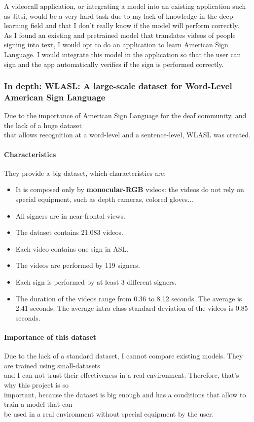 A videocall application, or integrating a model into an existing application such as Jitsi, would be a very hard task due to my lack of knowledge in the deep learning field and that I don't really know if the model will perform correctly. \\ 

As I found an existing and pretrained model that translates videos of people signing into text, I would opt to do an application to learn American Sign Language. I would integrate this model in the application so that the user can sign and the app automatically verifies if the sign is performed correctly.

\subsubsection{In depth: WLASL: A large-scale dataset for Word-Level American Sign Language}
Due to the importance of American Sign Language for the deaf community, and the lack of a huge dataset \\
that allows recognition at a word-level and a sentence-level, WLASL was created. 

\paragraph{Characteristics}
They provide a big dataset, which characteristics are:
\begin{itemize}
    \item It is composed only by \textbf{monocular-RGB} videos: the videos do not rely on special equipment, such as depth cameras, colored gloves...
    \item All signers are in near-frontal views.
    \item The dataset contains 21.083 videos.
    \item Each video contains one sign in ASL.
    \item The videos are performed by 119 signers.
    \item Each sign is performed by at least 3 different signers.
    \item The duration of the videos range from 0.36 to 8.12 seconds. The average is 2.41 seconds. The average intra-class standard deviation of the videos is 0.85 seconds.
\end{itemize}

\paragraph{Importance of this dataset}
Due to the lack of a standard dataset, I cannot compare existing models. They are trained using small-datasets \\
and I can not trust their effectiveness in a real environment. Therefore, that's why this project is so \\
important, because the dataset is big enough and has a conditions that allow to train a model that can \\
be used in a real environment without special equipment by the user.

